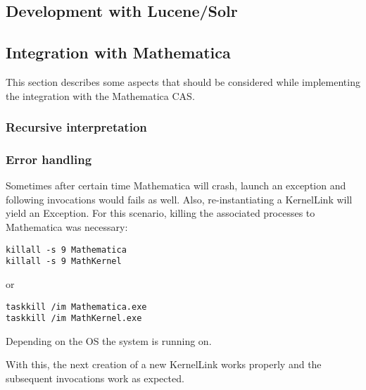 \subsection{Development with Lucene/Solr}

\subsection{Integration with Mathematica}
This section describes some aspects that should be considered while implementing the integration with the Mathematica CAS. 

\subsubsection{Recursive interpretation}

\subsubsection{Error handling}
Sometimes after certain time Mathematica will crash, launch an exception and following invocations would fails as well.
Also, re-instantiating a KernelLink will yield an Exception. For this scenario, killing the associated processes to Mathematica was necessary:

\begin{verbatim}
killall -s 9 Mathematica
killall -s 9 MathKernel
\end{verbatim} 

or 

\begin{verbatim}
taskkill /im Mathematica.exe
taskkill /im MathKernel.exe
\end{verbatim} 

Depending on the OS the system is running on.

With this, the next creation of a new KernelLink works properly and the subsequent invocations work as expected.

